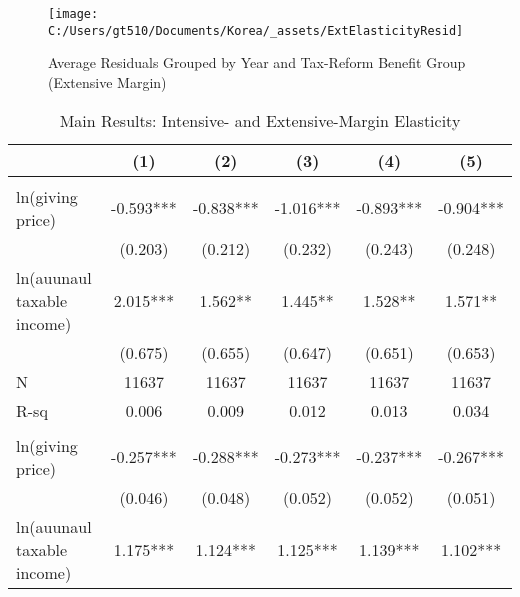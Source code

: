 \documentclass[ review  , 3p ]{elsarticle}
\begin{document}
  \begin{figure}
  
  {\centering \texttt{[image: C:/Users/gt510/Documents/Korea/\_assets/ExtElasticityResid]} 
  
  }
  
  \caption{Average Residuals Grouped by Year and Tax-Reform Benefit Group (Extensive Margin)}\label{fig:unnamed-chunk-4}
  \end{figure}
  
  \begin{table}
  
  \caption{\label{tab:kableEstimateElasticityPart2}Main Results: Intensive- and Extensive-Margin Elasticity}
  \centering
  \fontsize{8}{10}\selectfont
  \begin{threeparttable}
  \begin{tabular}[t]{lccccc}
  \toprule
   & (1) & (2) & (3) & (4) & (5)\\
  \midrule
  \addlinespace[0.3em]
  \multicolumn{6}{l}{\textbf{Intensive-Margin Elasticity}}\\
  \hspace{1em}ln(giving price) & -0.593*** & -0.838*** & -1.016*** & -0.893*** & -0.904***\\
  \hspace{1em} & (0.203) & (0.212) & (0.232) & (0.243) & (0.248)\\
  \hspace{1em}ln(auunaul taxable income) & 2.015*** & 1.562** & 1.445** & 1.528** & 1.571**\\
  \hspace{1em} & (0.675) & (0.655) & (0.647) & (0.651) & (0.653)\\
  \hspace{1em}N & 11637 & 11637 & 11637 & 11637 & 11637\\
  \hspace{1em}R-sq & 0.006 & 0.009 & 0.012 & 0.013 & 0.034\\
  \addlinespace[0.3em]
  \multicolumn{6}{l}{\textbf{Extensive-Margin Elasticity}}\\
  \hspace{1em}ln(giving price) & -0.257*** & -0.288*** & -0.273*** & -0.237*** & -0.267***\\
  \hspace{1em} & (0.046) & (0.048) & (0.052) & (0.052) & (0.051)\\
  \hspace{1em}ln(auunaul taxable income) & 1.175*** & 1.124*** & 1.125*** & 1.139*** & 1.102***\\

\end{tabular}
\end{threeparttable}
\end{table}
\end{document}
